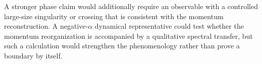 A stronger phase claim would additionally require an observable with a controlled large-size singularity or crossing that is consistent with the momentum reconstruction.
A negative-$\alpha$ dynamical representative could test whether the momentum reorganization is accompanied by a qualitative spectral transfer, but such a calculation would strengthen the phenomenology rather than prove a boundary by itself.
